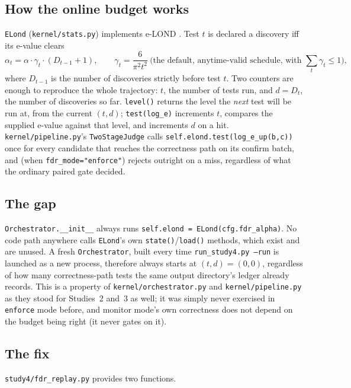 \documentclass[11pt]{article}
\begin{document}
\subsection{How the online budget works}

\texttt{ELond} (\texttt{kernel/stats.py}) implements e-LOND \citep{xu2024elond}. Test $t$ is declared a discovery iff its e-value clears
\[
\alpha_t = \alpha \cdot \gamma_t \cdot (D_{t-1}+1), \qquad \gamma_t = \frac{6}{\pi^2 t^2} \ \text{(the default, anytime-valid schedule, with } \textstyle\sum_t \gamma_t \le 1\text{)},
\]
where $D_{t-1}$ is the number of discoveries strictly before test $t$. Two counters are enough to reproduce the whole trajectory: $t$, the number of tests run, and $d=D_t$, the number of discoveries so far. \texttt{level()} returns the level the \emph{next} test will be run at, from the current $(t,d)$; \texttt{test(log\_e)} increments $t$, compares the supplied e-value against that level, and increments $d$ on a hit. \texttt{kernel/pipeline.py}'s \texttt{TwoStageJudge} calls \texttt{self.elond.test(log\_e\_up(b,c))} once for every candidate that reaches the correctness path on its confirm batch, and (when \texttt{fdr\_mode="enforce"}) rejects outright on a miss, regardless of what the ordinary paired gate decided.

\subsection{The gap}

\texttt{Orchestrator.\_\_init\_\_} always runs \texttt{self.elond = ELond(cfg.fdr\_alpha)}. No code path anywhere calls \texttt{ELond}'s own \texttt{state()}/\texttt{load()} methods, which exist and are unused. A fresh \texttt{Orchestrator}, built every time \texttt{run\_study4.py~--run} is launched as a new process, therefore always starts at $(t,d)=(0,0)$, regardless of how many correctness-path tests the same output directory's ledger already records. This is a property of \texttt{kernel/orchestrator.py} and \texttt{kernel/pipeline.py} as they stood for Studies~2 and~3 as well; it was simply never exercised in \texttt{enforce} mode before, and monitor mode's own correctness does not depend on the budget being right (it never gates on it).

\subsection{The fix}

\texttt{study4/fdr\_replay.py} provides two functions.
\end{document}
